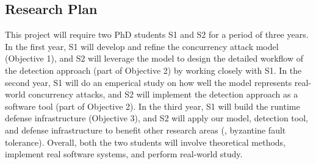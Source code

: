 \vspace{-.15in}\subsection{Research Plan} \label{sec:plan}\vspace{-.075in}

This \xxx project will require two PhD students S1 and S2 for a period of 
three years. In the first year, S1 will develop and refine the concurrency 
attack model (Objective 1), and S2 will leverage the model to design the 
detailed workflow of the detection approach (part of Objective 2) by working 
closely with S1. In the second year, S1 will do an emperical study on how well 
the model represents real-world concurrency attacks, and S2 will implement 
the detection approach as a software tool (part of Objective 2). In the third 
year, S1 will build the runtime defense infrastructure (Objective 3), and S2 
will apply our model, detection tool, and defense infrastructure to benefit 
other research areas (\eg, byzantine fault tolerance). Overall, both the two 
students will involve theoretical methods, implement real software systems, and 
perform real-world study.


